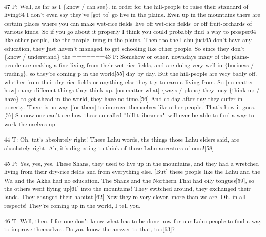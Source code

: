 \textsuperscript{47 P: Well, as far as I \{know / can see\}, in order for the hill-people
to raise their standard of living64 I don't even say they've [got to] go live in
the plains. Even up in the mountains there are certain places where you can make
wet-rice fields--live off wet-rice fields--or off fruit-orchards of various kinds.
So if you go about it properly I think you could probably find a way to prosper64
like other people, like the people living in the plains. Then too the Lahu just65
don't have any education, they just haven't managed to get schooling like other
people. So since they don't \{know / understand\} the =======43 P: Somehow or other,
nowadays many of the plains-people are making a fine living from their wet-rice
fields, and are doing very well in \{business / trading\}, so they're coming p
in the world[55] day by day. But the hill-people are very badly off, whether from
their dry-rice fields or anything else they try to earn a living from. So [no matter
how] many different things they think up, [no matter what] \{ways / plans\} they
may \{think up / have\} to get ahead in the world, they have no time.[56] And so
day after day they suffer in poverty. There is no way [for them] to improve themselves
like other people. That's how it goes.[57] So now one can't see how these so-called
\texttt{"}hill-tribesmen\texttt{"} will ever be able to find a way to work themselves
up. }

\textsuperscript{44 T: Oh, tat's absolutely right! These Lahu words, the things
those Lahu elders said, are absolutely right. Ah, it's disgusting to think of those
Lahu ancestors of ours![58]}

\textsuperscript{45 P: Yes, yes, yes. These Shans, they used to live up in the
mountains, and they had a wretched living from their dry-rice fields and from everything
else. [But] these people like the Lahu and the Wa and the Akha had no education.
The Shans and the Northern Thai had oily tongues[59], so the others went flying
up[61] into the mountains! They switched around, they exchanged their lands. They
changed their habitat.[62] Now they're very clever, more than we are. Oh, in all
respects! They're coming up in the world, I tell you.}

\textsuperscript{46 T: Well, then, I for one don't know what has to be done now
for our Lahu people to find a way to improve themselves. Do you know the answer
to that, too[63]?}

